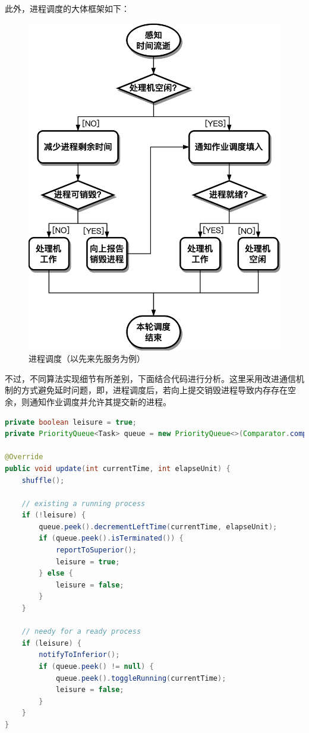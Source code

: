 \documentclass[UTF8]{ctexart}
\begin{document}
此外，进程调度的大体框架如下：
\begin{figure}[htbp]
    \centering
    \includegraphics{i-process-fcfs.png}
    \caption{进程调度（以先来先服务为例）}
\end{figure}

不过，不同算法实现细节有所差别，下面结合代码进行分析。这里采用改进通信机制的方式避免延时问题，即，进程调度后，若向上提交销毁进程导致内存存在空余，则通知作业调度并允许其提交新的进程。

\begin{lstlisting}[language={java},caption={先来先服务}]
private boolean leisure = true;
private PriorityQueue<Task> queue = new PriorityQueue<>(Comparator.comparingInt(Task::getProcessArriveTime));

@Override
public void update(int currentTime, int elapseUnit) {
    shuffle();

    // existing a running process
    if (!leisure) {
        queue.peek().decrementLeftTime(currentTime, elapseUnit);
        if (queue.peek().isTerminated()) {
            reportToSuperior();
            leisure = true;
        } else {
            leisure = false;
        }
    }

    // needy for a ready process
    if (leisure) {
        notifyToInferior();
        if (queue.peek() != null) {
            queue.peek().toggleRunning(currentTime);
            leisure = false;
        }
    }
}
\end{lstlisting}
\end{document}
